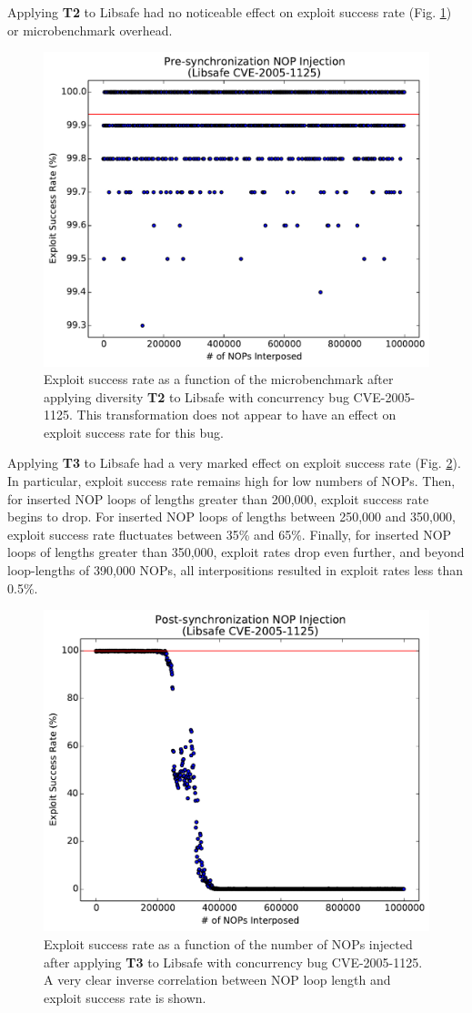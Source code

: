 Applying \textbf{T2} to Libsafe had no noticeable effect on exploit success rate (Fig. \ref{fig_libsafe-pre}) or microbenchmark overhead.
\begin{figure}
	\centering
	\includegraphics[width=.75\columnwidth]{figures/libsafe-pre}
	\caption{
		Exploit success rate as a function of the microbenchmark after applying diversity \textbf{T2} to Libsafe with concurrency bug CVE-2005-1125.
		This transformation does not appear to have an effect on exploit success rate for this bug.
	}
	\label{fig_libsafe-pre}
\end{figure}

Applying \textbf{T3} to Libsafe had a very marked effect on exploit success rate (Fig. \ref{fig_libsafe-post}).
In particular, exploit success rate remains high for low numbers of NOPs.
Then, for inserted NOP loops of lengths greater than 200,000, exploit success rate begins to drop.
For inserted NOP loops of lengths between 250,000 and 350,000, exploit success rate fluctuates between 35\% and 65\%.
Finally, for inserted NOP loops of lengths greater than 350,000, exploit rates drop even further, and beyond loop-lengths of 390,000 NOPs, all interpositions resulted in exploit rates less than 0.5\%.
\begin{figure}
	\centering
	\includegraphics[width=.75\columnwidth]{figures/libsafe-post}
	\caption{
		Exploit success rate as a function of the number of NOPs injected after applying \textbf{T3} to Libsafe with concurrency bug CVE-2005-1125.
		A very clear inverse correlation between NOP loop length and exploit success rate is shown.
	}
	\label{fig_libsafe-post}
\end{figure}

